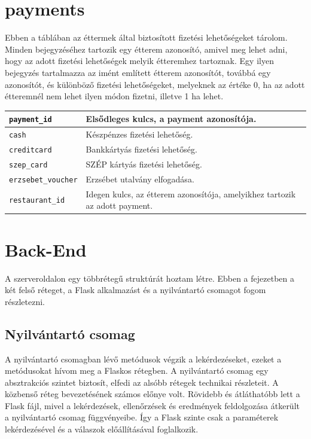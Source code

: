 \section{payments}

Ebben a táblában az éttermek által biztosított fizetési lehetőségeket tárolom. Minden bejegyzéséhez tartozik egy étterem azonosító, amivel meg lehet adni, hogy az adott fizetési lehetőségek melyik étteremhez tartoznak. Egy ilyen bejegyzés tartalmazza az imént említett étterem azonosítót, továbbá egy azonosítót, és különböző fizetési lehetőségeket, melyeknek az értéke 0, ha az adott étteremnél nem lehet ilyen módon fizetni, illetve 1 ha lehet.

\begin{tabular}{|p{3cm}|p{10cm}|}
    \texttt{payment\_id} & Elsődleges kulcs, a payment azonosítója. \\
    \hline
    \texttt{cash} & Készpénzes fizetési lehetőség. \\
    \hline
    \texttt{creditcard} & Bankkártyás fizetési lehetőség. \\
    \hline
    \texttt{szep\_card} & SZÉP kártyás fizetési lehetőség. \\
    \hline
    \texttt{erzsebet\_voucher} & Erzsébet utalvány elfogadása. \\
    \hline
    \texttt{restaurant\_id} & Idegen kulcs, az étterem azonosítója, amelyikhez tartozik az adott payment. \\
    \hline
\end{tabular}

\section{Back-End}

A szerveroldalon egy többrétegű struktúrát hoztam létre. Ebben a fejezetben a két felső réteget, a Flask alkalmazást és a nyilvántartó csomagot fogom részletezni.

\subsection{Nyilvántartó csomag}

A nyilvántartó csomagban lévő metódusok végzik a lekérdezéseket, ezeket a metódusokat hívom meg a Flaskos rétegben. A nyilvántartó csomag egy absztrakciós szintet biztosít, elfedi az alsóbb rétegek technikai részleteit. A közbenső réteg bevezetésének számos előnye volt. Rövidebb és átláthatóbb lett a Flask fájl, mivel a lekérdezések, ellenőrzések és eredmények feldolgozása átkerült a nyilvántartó csomag függvényeibe. Így a Flask szinte csak a paraméterek lekérdezésével és a válaszok előállításával foglalkozik.

